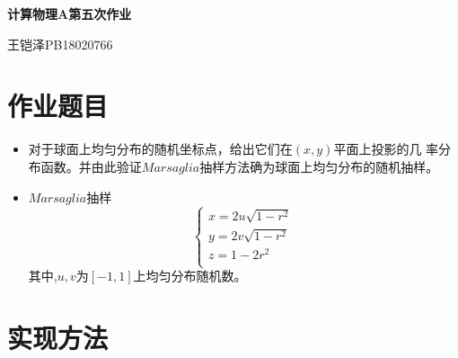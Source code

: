 \documentclass[UTF8]{ctexart}
\begin{document}
	\centering\textbf{\LARGE{计算物理A第五次作业}}
	
	
	王铠泽\qquad PB18020766
	
		
	\section{作业题目}
	
	\begin{itemize}
		\item 对于球面上均匀分布的随机坐标点，给出它们在$(x,y)$平面上投影的几
		率分布函数。并由此验证$Marsaglia$抽样方法确为球面上均匀分布的随机抽样。
		\item $Marsaglia$抽样
		$$\left\{
		\begin{array}{lc}
			x=2u\sqrt{1-r^2}\\
			y=2v\sqrt{1-r^2}\\
			z=1-2r^2\\
		\end{array}
		\right.$$
	其中,$u,v$为$[-1,1]$上均匀分布随机数。
	\end{itemize}
	
	\section{实现方法}
	
\end{document}
